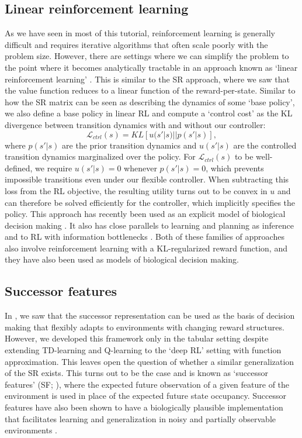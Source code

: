 \subsection{Linear reinforcement learning}
\label{sec:linear_RL}
As we have seen in most of this tutorial, reinforcement learning is generally difficult and requires iterative algorithms that often scale poorly with the problem size.
However, there are settings where we can simplify the problem to the point where it becomes analytically tractable in an approach known as `linear reinforcement learning' \citep{todorov2006linearly, todorov2009efficient}.
This is similar to the SR approach, where we saw that the value function reduces to a linear function of the reward-per-state.
Similar to how the SR matrix can be seen as describing the dynamics of some `base policy', we also define a base policy in linear RL and compute a `control cost' as the KL divergence between transition dynamics with and without our controller:
\begin{equation}
    \mathcal{L}_{ctrl}(s) = KL \left [ u(s' | s) || p(s'|s) \right ],
\end{equation}
where $p(s' | s)$ are the prior transition dynamics and $u(s' | s)$ are the controlled transition dynamics marginalized over the policy.
For $\mathcal{L}_{ctrl}(s)$ to be well-defined, we require $u(s'|s) = 0$ whenever $p(s'|s) = 0$, which prevents impossible transitions even under our flexible controller.
When subtracting this loss from the RL objective, the resulting utility turns out to be convex in $u$ and can therefore be solved efficiently for the controller, which implicitly specifies the policy.
This approach has recently been used as an explicit model of biological decision making \citep{piray2021linear,piray2024reconciling}.
It also has close parallels to learning and planning as inference \citep{levine2018reinforcement, solway2012goal,botvinick2012planning} and to RL with information bottlenecks \citep{lai2021policy}.
Both of these families of approaches also involve reinforcement learning with a KL-regularized reward function, and they have also been used as models of biological decision making.

\subsection{Successor features}
\label{sec:SFs}
In , we saw that the successor representation can be used as the basis of decision making that flexibly adapts to environments with changing reward structures.
However, we developed this framework only in the tabular setting despite extending TD-learning and Q-learning to the `deep RL' setting with function approximation.
This leaves open the question of whether a similar generalization of the SR exists.
This turns out to be the case and is known as `successor features' (SF; \citealp{barreto2017successor}), where the expected future observation of a given feature of the environment is used in place of the expected future state occupancy.
Successor features have also been shown to have a biologically plausible implementation that facilitates learning and generalization in noisy and partially observable environments \citep{vertes2019neurally}.


